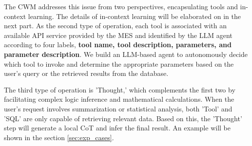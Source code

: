 \documentclass[preprint,12pt]{elsarticle}
\providecommand{\DIFaddbegin}{} %
\newcommand{\DIFaddincludegraphics}[2][]{{\color{blue}\fbox{\DIFOincludegraphics[#1]{#2}}}} %
\DeclareRobustCommand{\DIFaddbegin}{\DIFOaddbegin \let\includegraphics\DIFaddincludegraphics} %
\begin{document}
The CWM addresses this issue from two perspectives, encapsulating tools and in-context learning.
The details of in-context learning will be elaborated on in the next part.
As the second type of operation, each tool is associated with an available API service provided by the MES and identified by the LLM agent according to four labels, \textbf{tool name, tool description, parameters, and parameter description}. 
We build an LLM-based agent to autonomously decide which tool to invoke and determine the appropriate parameters based on the user's query or the retrieved results from the database.

The third type of operation is 'Thought,' which complements the first two by facilitating complex logic inference and mathematical calculations.
When the user's request involves summarization or statistical analysis, both 'Tool' and 'SQL' are only capable of retrieving relevant data.
Based on this, the 'Thought' step will generate a local CoT and infer the final result.
An example will be shown in the section \ref{sec:exp_cases}.

\DIFaddbegin 
\end{document}
